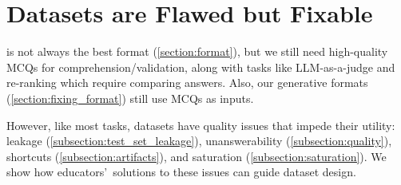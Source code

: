 \section{\mcqa Datasets are Flawed but Fixable} \label{section:dataset}

\mcqa is not always the best format (\cref{section:format}), but we still need high-quality MCQs for comprehension/validation, along with tasks like LLM-as-a-judge \cite{gu2024olmes} and re-ranking \cite{ma-etal-2023-large} which require comparing answers.
Also, our generative \mcqa formats (\cref{section:fixing_format}) still use MCQs as inputs.

However, like most  tasks, \mcqa datasets have quality issues that impede their utility: leakage
(\cref{subsection:test_set_leakage}), unanswerability
(\cref{subsection:quality}), shortcuts (\cref{subsection:artifacts}),
and saturation (\cref{subsection:saturation}).
We show how educators'~solutions to these issues can guide  dataset design.












